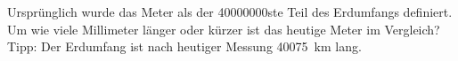 \begin{aufgabe}
	Ursprünglich wurde das Meter als der \num{40000000}ste Teil des Erdumfangs definiert.
	Um wie viele Millimeter länger oder kürzer ist das heutige Meter im Vergleich?
	Tipp: Der Erdumfang ist nach heutiger Messung \SI{40075}{km} lang.
\end{aufgabe}
